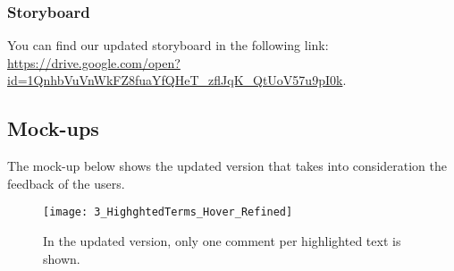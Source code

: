 \subsubsection{Storyboard}

You can find our updated storyboard in the following link: 
\url{https://drive.google.com/open?id=1QnhbVuVnWkFZ8fuaYfQHeT_zflJqK_QtUoV57u9pI0k}.

\subsection{Mock-ups}

The mock-up below shows the updated version that takes into consideration the 
feedback of the users.
 
\begin{figure}[H]
\centering
\texttt{[image: 3\_HighghtedTerms\_Hover\_Refined]}
\caption{In the updated version, only one comment per highlighted text is shown.}
\end{figure}


